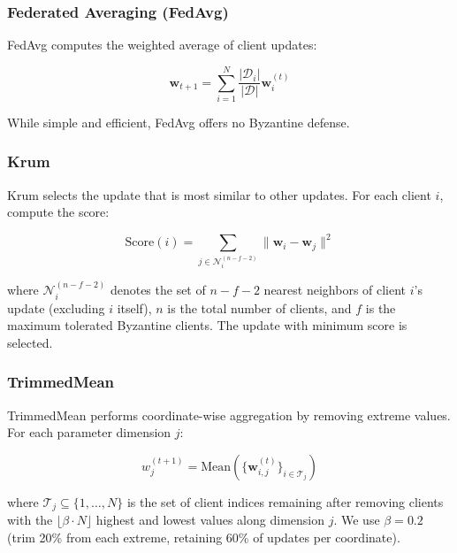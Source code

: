 \documentclass[12pt,a4paper,onecolumn]{article}
\begin{document}
\subsubsection{Federated Averaging (FedAvg)}

FedAvg computes the weighted average of client updates:

\begin{equation}
\mathbf{w}_{t+1} = \sum_{i=1}^{N} \frac{|\mathcal{D}_i|}{|\mathcal{D}|} \mathbf{w}_i^{(t)}
\label{eq:fedavg}
\end{equation}

While simple and efficient, FedAvg offers no Byzantine defense.

\subsubsection{Krum}

Krum selects the update that is most similar to other updates. For each client $i$, compute the score:

\begin{equation}
\text{Score}(i) = \sum_{j \in \mathcal{N}_i^{(n-f-2)}} \|\mathbf{w}_i - \mathbf{w}_j\|^2
\label{eq:krum_score}
\end{equation}

where $\mathcal{N}_i^{(n-f-2)}$ denotes the set of $n-f-2$ nearest neighbors of client $i$'s update (excluding $i$ itself), $n$ is the total number of clients, and $f$ is the maximum tolerated Byzantine clients. The update with minimum score is selected.

\subsubsection{TrimmedMean}

TrimmedMean performs coordinate-wise aggregation by removing extreme values. For each parameter dimension $j$:

\begin{equation}
w_j^{(t+1)} = \text{Mean}\left(\{\mathbf{w}_{i,j}^{(t)}\}_{i \in \mathcal{T}_j}\right)
\label{eq:trimmed_mean}
\end{equation}

where $\mathcal{T}_j \subseteq \{1,\ldots,N\}$ is the set of client indices remaining after removing clients with the $\lfloor\beta \cdot N\rfloor$ highest and lowest values along dimension $j$. We use $\beta = 0.2$ (trim 20\% from each extreme, retaining 60\% of updates per coordinate).
\end{document}
